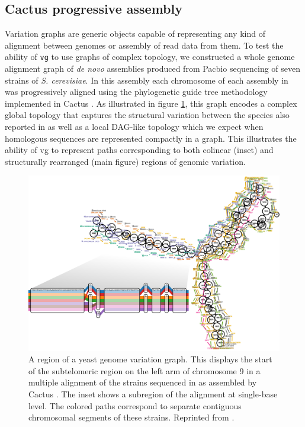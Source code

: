 \subsection{Cactus progressive assembly}
\label{sec:yeast_cactus}

Variation graphs are generic objects capable of representing any kind of alignment between genomes or assembly of read data from them.
To test the ability of {\tt vg} to use graphs of complex topology, we constructed a whole genome alignment graph of \emph{de novo} assemblies produced from Pacbio sequencing of seven strains of \emph{S. cerevisiae}.
In this assembly each chromosome of each assembly in \cite{yue2017contrasting} was progressively aligned using the phylogenetic guide tree methodology implemented in Cactus \cite{Paten:2011fva}.
As illustrated in figure \ref{fig:cactus_yeast_zoom}, this graph encodes a complex global topology that captures the structural variation between the species also reported in \cite{yue2017contrasting} as well as a local DAG-like topology which we expect when homologous sequences are represented compactly in a graph.
This illustrates the ability of vg to represent paths corresponding to both colinear (inset) and structurally rearranged (main figure) regions of genomic variation.

\begin{figure}[htbp!]
  \centering
  \includegraphics[width=1.0\textwidth]{Chapter3/Figs/cactus_yeast_zoom.pdf}
  \caption[Cactus yeast variation graph]{
  A region of a yeast genome variation graph.
  This displays the start of the subtelomeric region on the left arm of chromosome 9 in a multiple alignment of the strains sequenced in \cite{yue2017contrasting} as assembled by Cactus \cite{Paten:2011fva}.
  The inset shows a subregion of the alignment at single-base level.
  The colored paths correspond to separate contiguous chromosomal segments of these strains.
  Reprinted from \cite{garrison2018variation}.
  }
  \label{fig:cactus_yeast_zoom}
\end{figure}

